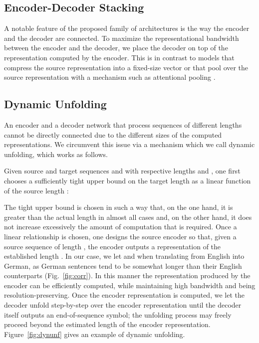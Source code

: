 \documentclass{article}
\newcommand{\figref}[1]{Fig.~\ref{#1}}
\begin{document}
\subsection{Encoder-Decoder Stacking}
\label{sec:stacking}
A notable feature of the proposed family of architectures is the way the encoder and the decoder are connected. To maximize the representational bandwidth between the encoder and the decoder, we place the decoder on top of the representation computed by the encoder. This is in contrast to models that compress the source representation into a fixed-size vector \citep{kalchbrenner13emnlp,DBLP:conf/nips/SutskeverVL14} or that pool over the source representation with a mechanism such as attentional pooling \citep{DBLP:journals/corr/BahdanauCB14}. 

\subsection{Dynamic Unfolding}
\label{sec:dynunf}
An encoder and a decoder network that process sequences of different lengths cannot be directly connected due to the different sizes of the computed representations. We circumvent this issue via a mechanism which we call dynamic unfolding, which works as follows.

Given source and target sequences  and  with respective lengths  and , one first chooses a sufficiently tight upper bound  on the target length  as a linear function of the source length :

The tight upper bound  is chosen in such a way that, on the one hand, it is greater than the actual length  in almost all cases and, on the other hand, it does not increase excessively the  amount of computation that is required. Once a linear relationship is chosen, one designs the source encoder so that, given a source sequence of length , the encoder outputs a representation of the established length . In our case, we let  and  when translating from English into German, as German sentences tend to be somewhat longer than their English counterparts (\figref{fig:corr}). In this manner the representation produced by the encoder can be efficiently computed, while maintaining high bandwidth and being resolution-preserving. Once the encoder representation is computed, we let the decoder unfold step-by-step over the encoder representation until the decoder itself outputs an end-of-sequence symbol; the unfolding process may freely proceed beyond the estimated length  of the encoder representation. Figure~\ref{fig:dynunf} gives an example of dynamic unfolding. 
\end{document}
